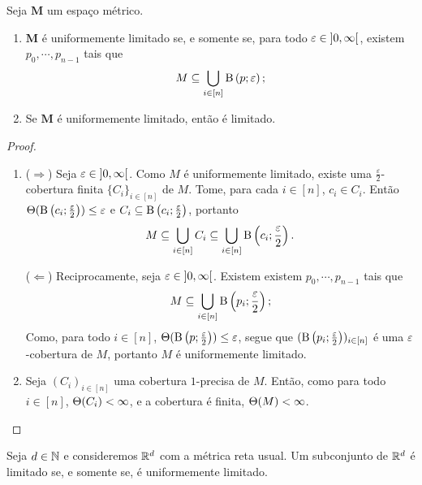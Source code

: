 \begin{proposition}
Seja $\bm M$ um espaço métrico.
	\begin{enumerate}
	\item $\bm M$ é uniformemente limitado se, e somente se, para todo $\varepsilon \in \left]0,\allowbreak \infty\right[$, existem $p_0,\cdots,p_{n-1}$ tais que
		\begin{equation*}
		M \subseteq \bigcup_{i \in [n]} \mathrm{B}\left(p; \varepsilon\right);
		\end{equation*}
	\item Se $\bm M$ é uniformemente limitado, então é limitado.
	\end{enumerate}
\end{proposition}
\begin{proof}
	\begin{enumerate}
	\item ($\Rightarrow$) Seja $\varepsilon \in \left]0,\allowbreak \infty\right[$. Como $M$ é uniformemente limitado, existe uma $\frac{\varepsilon}{2}$-cobertura finita $\{C_i\}_{i \in [n]}$ de $M$. Tome, para cada $i \in [n]$, $c_i \in C_i$. Então $\Theta(\mathrm{B}\left(c_i; \frac{\varepsilon}{2}\right)) \leq \varepsilon$ e $C_i \subseteq \mathrm{B}\left(c_i; \frac{\varepsilon}{2}\right)$, portanto
	\begin{equation*}
	M \subseteq \bigcup_{i \in [n]} C_i \subseteq \bigcup_{i \in [n]} \mathrm{B}\left(c_i; \frac{\varepsilon}{2}\right).
	\end{equation*}

($\Leftarrow$) Reciprocamente, seja $\varepsilon \in \left]0,\allowbreak \infty\right[$. Existem existem $p_0,\cdots,p_{n-1}$ tais que
		\begin{equation*}
		M \subseteq \bigcup_{i \in [n]} \mathrm{B}\left(p_i; \frac{\varepsilon}{2}\right);
		\end{equation*}
Como, para todo $i \in [n]$, $\Theta(\mathrm{B}\left(p; \frac{\varepsilon}{2}\right)) \leq \varepsilon$, segue que $(\mathrm{B}\left(p_i; \frac{\varepsilon}{2}\right))_{i \in [n]}$ é uma $\varepsilon$-cobertura de $M$, portanto $M$ é uniformemente limitado.

	\item Seja $(C_i)_{i \in [n]}$ uma cobertura $1$-precisa de $M$. Então, como para todo $i \in [n]$, $\Theta(C_i) < \infty$, e a cobertura é finita, $\Theta(M) < \infty$.
	\end{enumerate}
\end{proof}

\begin{exercise}
Seja $d \in \mathbb{N}$ e consideremos $\mathbb{R}^d$ com a métrica reta usual. Um subconjunto de $\mathbb{R}^d$ é limitado se, e somente se, é uniformemente limitado.
\end{exercise}

